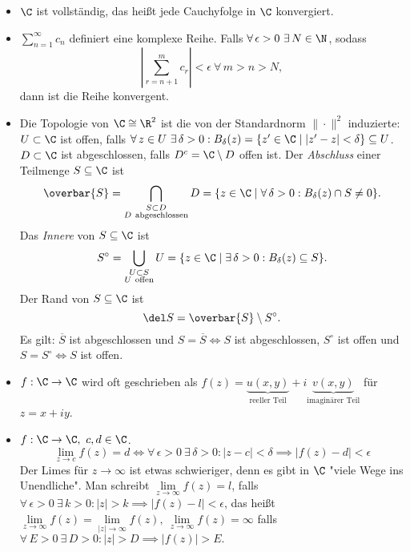 \begin{itemize}
	\item $\C$ ist vollständig, das heißt jede Cauchyfolge in $\C$ konvergiert.
	
	\item $ \sum_{n=1}^{\infty} c_n $ definiert eine komplexe Reihe. Falls $ \forall \, \epsilon > 0 \ \exists \, N \in \N $, sodass 
	$$ \left| \sum_{r=n+1}^{m} c_r \right| < \epsilon\ \forall\, m>n>N, $$
	dann ist die Reihe konvergent.
	
	\item Die Topologie von $ \C \cong \R^2 $ ist die von der Standardnorm $ \|\cdot\|^2 $ induzierte:\\
	$ U \subset \C $ ist offen, falls $ \forall\, z \in U \ \exists\, \delta > 0: B_\delta(z) = \{z^\prime \in \C \mid |z^\prime-z| < \delta \} \subseteq U $. $ D \subset \C $ ist abgeschlossen, falls $ D^c = \C \setminus D $ offen ist. Der \emph{Abschluss} einer Teilmenge $ S \subseteq \C $ ist 
	$$ \overbar{S} = \bigcap_{\substack{S \subset D\\D\ \text{abgeschlossen}}} D = \{ z \in \C \mid \forall\, \delta > 0: B_\delta(z) \cap S \neq 0 \}. $$
	Das \emph{Innere} von $ S \subseteq \C $ ist 
	$$ S^\circ = \bigcup_{\substack{U \subset S\\U\ \text{offen}}} U = \{ z \in \C\mid \exists\, \delta>0: B_\delta(z) \subseteq S \}. $$
	Der Rand von $ S \subseteq \C $ ist
	\[ \del S = \overbar{S}\setminus S^\circ. \]
	Es gilt: $ \overbar{S} $ ist abgeschlossen und $ S = \overbar{S} \iff S $ ist abgeschlossen, $ S^\circ $ ist offen und $ S = S^\circ \iff S $ ist offen.
	
	\item $ f: \C \to \C $ wird oft geschrieben als $ f(z) = \underbrace{u(x,y)}_{\text{reeller Teil}} + i\underbrace{v(x,y)}_{\text{imaginärer Teil}} $ für $ z = x+iy $.
	
	\item $ f: \C \to \C,\ c,d \in \C $. 
	$$ \lim_{z \to c} f(z) = d \iff \forall\, \epsilon > 0 \ \exists\, \delta >0: |z-c| < \delta \implies |f(z)-d|<\epsilon $$
	Der Limes für $ z \to \infty $ ist etwas schwieriger, denn es gibt in $\C$ "viele Wege ins Unendliche". Man schreibt $ \lim\limits_{z \to \infty} f(z) = l $, falls $ \forall \, \epsilon > 0 \ \exists\, k>0: |z|>k \implies |f(z)-l|<\epsilon $, das heißt $ \lim\limits_{z \to \infty} f(z) = \lim\limits_{|z| \to \infty} f(z),\ \lim\limits_{z \to \infty} f(z) = \infty $ falls $ \forall\, E>0 \ \exists\, D>0: |z|>D \implies |f(z)|>E. $
	

\end{itemize}
